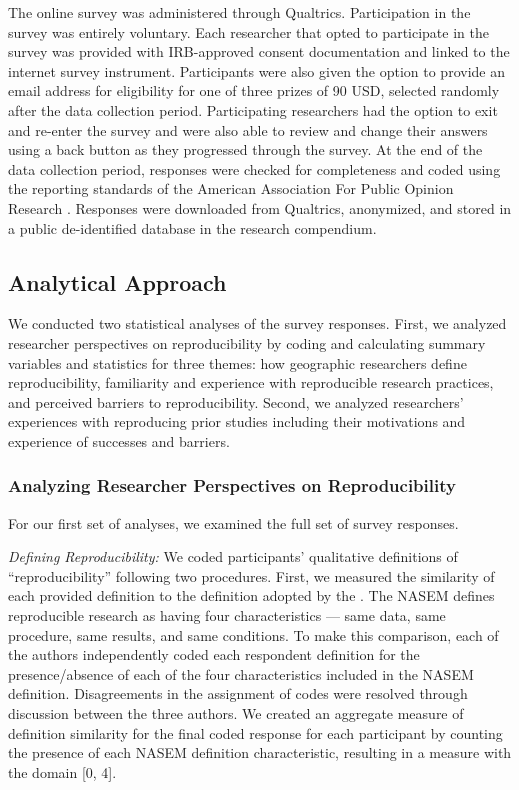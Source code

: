 \documentclass[]{interact}
\newcommand{\citep}{\parencite}
\theoremstyle{plain}%
\theoremstyle{definition}
\theoremstyle{remark}
\begin{document}
The online survey was administered through Qualtrics. 
Participation in the survey was entirely voluntary. 
Each researcher that opted to participate in the survey was provided with IRB-approved consent documentation and linked to the internet survey instrument. 
Participants were also given the option to provide an email address for eligibility for one of three  prizes of 90 USD, selected randomly after the data collection period.
Participating researchers had the option to exit and re-enter the survey and were also able to review and change their answers using a back button as they progressed through the survey.
At the end of the data collection period, responses were checked for completeness and coded using the reporting standards of the American Association For Public Opinion Research \citep{aaporstandards}.
Responses were downloaded from Qualtrics, anonymized, and stored in a public de-identified database in the research compendium.

\subsection*{Analytical Approach}

We conducted two statistical analyses of the survey responses.
First, we analyzed researcher perspectives on reproducibility by coding and calculating summary variables and statistics for three themes: how geographic researchers define reproducibility, familiarity and experience with reproducible research practices, and perceived barriers to reproducibility.
Second, we analyzed researchers' experiences with reproducing prior studies including their motivations and experience of successes and barriers.

\subsubsection*{Analyzing Researcher Perspectives on Reproducibility}

\noindent For our first set of analyses, we examined the full set of survey responses.

\textit{Defining Reproducibility:} 
We coded participants' qualitative definitions of ``reproducibility'' following two procedures.
First, we measured the similarity of each provided definition to the definition adopted by the \textcite{NASEM2019}. 
The NASEM defines reproducible research as having four characteristics --- same data, same procedure, same results, and same conditions.
To make this comparison, each of the authors independently coded each respondent definition for the presence/absence of each of the four characteristics included in the NASEM definition.
Disagreements in the assignment of codes were resolved through discussion between the three authors.
We created an aggregate measure of definition similarity for the final coded response for each participant by counting the presence of each NASEM definition characteristic, resulting in a measure with the domain [0, 4].
\end{document}
